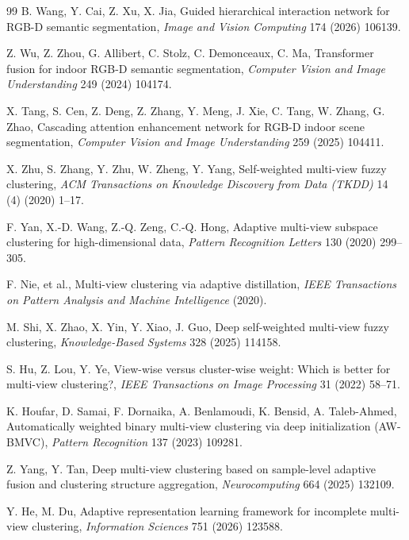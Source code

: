 \documentclass[11pt, a4paper]{article}
\begin{document}
{{{\begin{thebibliography}{99}
B. Wang, Y. Cai, Z. Xu, X. Jia, Guided hierarchical interaction network for RGB-D semantic segmentation, \textit{Image and Vision Computing} 174 (2026) 106139.

Z. Wu, Z. Zhou, G. Allibert, C. Stolz, C. Demonceaux, C. Ma, Transformer fusion for indoor RGB-D semantic segmentation, \textit{Computer Vision and Image Understanding} 249 (2024) 104174.

X. Tang, S. Cen, Z. Deng, Z. Zhang, Y. Meng, J. Xie, C. Tang, W. Zhang, G. Zhao, Cascading attention enhancement network for RGB-D indoor scene segmentation, \textit{Computer Vision and Image Understanding} 259 (2025) 104411.

X. Zhu, S. Zhang, Y. Zhu, W. Zheng, Y. Yang, Self-weighted multi-view fuzzy clustering, \textit{ACM Transactions on Knowledge Discovery from Data (TKDD)} 14 (4) (2020) 1--17.

F. Yan, X.-D. Wang, Z.-Q. Zeng, C.-Q. Hong, Adaptive multi-view subspace clustering for high-dimensional data, \textit{Pattern Recognition Letters} 130 (2020) 299--305.

F. Nie, et al., Multi-view clustering via adaptive distillation, \textit{IEEE Transactions on Pattern Analysis and Machine Intelligence} (2020).

M. Shi, X. Zhao, X. Yin, Y. Xiao, J. Guo, Deep self-weighted multi-view fuzzy clustering, \textit{Knowledge-Based Systems} 328 (2025) 114158.

S. Hu, Z. Lou, Y. Ye, View-wise versus cluster-wise weight: Which is better for multi-view clustering?, \textit{IEEE Transactions on Image Processing} 31 (2022) 58--71.

K. Houfar, D. Samai, F. Dornaika, A. Benlamoudi, K. Bensid, A. Taleb-Ahmed, Automatically weighted binary multi-view clustering via deep initialization (AW-BMVC), \textit{Pattern Recognition} 137 (2023) 109281.

Z. Yang, Y. Tan, Deep multi-view clustering based on sample-level adaptive fusion and clustering structure aggregation, \textit{Neurocomputing} 664 (2025) 132109.

Y. He, M. Du, Adaptive representation learning framework for incomplete multi-view clustering, \textit{Information Sciences} 751 (2026) 123588.


\end{thebibliography}}}}
\end{document}

